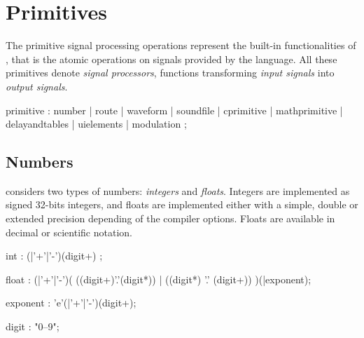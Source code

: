 \section{Primitives}
\label{primitives}
The primitive signal processing operations represent the built-in functionalities of \faust, that is the atomic operations on signals provided by the language. All these primitives denote \emph{signal processors}, functions transforming \emph{input signals} into \emph{output signals}.

\begin{rail}
	primitive : number
	| route
	| waveform
	| soundfile
	| cprimitive
	| mathprimitive
	| delayandtables
	| uielements
	| modulation
	;
\end{rail}

\subsection{Numbers}

\faust considers two types of numbers: \textit{integers} and \textit{floats}. Integers are implemented as signed 32-bits integers, and floats are implemented either with a simple, double or extended precision depending of the compiler options. Floats are available in decimal or scientific notation.

\begin{rail}
	int : (|'+'|'-')(digit+) ;
\end{rail}

\begin{rail}
	float : (|'+'|'-')( ((digit+)'.'(digit*)) | ((digit*) '.' (digit+)) )(|exponent);
\end{rail}

\begin{rail}
	exponent : 'e'(|'+'|'-')(digit+);
\end{rail}

\begin{rail}
	digit : "0--9";
\end{rail}

\bigskip

